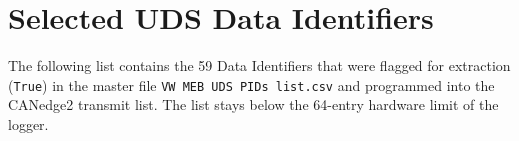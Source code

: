 \documentclass[11pt,a4paper,oneside,parskip=half]{scrreprt}
\begin{document}
\section{Selected UDS Data Identifiers}
The following list contains the 59 Data Identifiers that were flagged for extraction (\texttt{True}) in the master file \texttt{VW MEB UDS PIDs list.csv} and programmed into the CANedge2 transmit list. The list stays below the 64-entry hardware limit of the logger.


\end{document}
